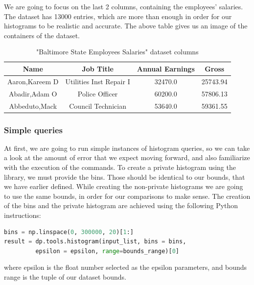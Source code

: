 We are going to focus on the last 2 columns, containing the employees' salaries. The dataset has 13000 entries, which are more than enough in order for our histograms to be realistic and accurate. The above table gives us an image of the containers of the dataset.

\begin{table}[!htb]
    \centering

    \caption{"Baltimore State Employees Salaries" dataset columns}
    \label{numbers}

    \begin{tabular}{| c | c | c | c |}
      \hline 
      Name & Job Title & Annual Earnings & Gross \\
      \hline
      Aaron,Kareem D & Utilities Inst Repair I	 & 32470.0 & 25743.94 \\
      \hline
      Abadir,Adam O	 & Police Officer &  60200.0 & 57806.13  \\
      \hline
      Abbeduto,Mack & Council Technician & 53640.0 &  59361.55 \\
      \hline
    \end{tabular}
\end{table}

\subsubsection{Simple queries}

At first, we are going to run simple instances of histogram queries, so we can take a look at the amount of error that we expect moving forward, and also familiarize with the execution of the commands. To create a private histogram using the library, we must provide the bins. Those should be identical to our bounds, that we have earlier defined. While creating the non-private histograms we are going to use the same bounds, in order for our comparisons to make sense. The creation of the bins and the private histogram are achieved using the following Python instructions:

\bigskip
\begin{lstlisting}[basicstyle= \footnotesize,
language=Python]
bins = np.linspace(0, 300000, 20)[1:]
result = dp.tools.histogram(input_list, bins = bins, 
         epsilon = epsilon, range=bounds_range)[0]
\end{lstlisting}
\bigskip

where epsilon is the float number selected as the epsilon parameters, and bounds range is the tuple of our dataset bounds.

